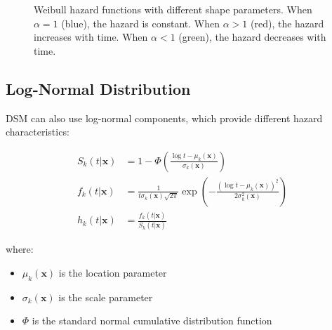 \begin{figure}[htbp]
    \centering
    \caption{Weibull hazard functions with different shape parameters. When $\alpha = 1$ (blue), the hazard is constant. When $\alpha > 1$ (red), the hazard increases with time. When $\alpha < 1$ (green), the hazard decreases with time.}
    \label{fig:weibull-hazards}
\end{figure}

\subsection{Log-Normal Distribution}

DSM can also use log-normal components, which provide different hazard characteristics:

\begin{equationbox}[title=Log-Normal Distribution Functions]
\begin{align}
    S_k(t|\mathbf{x}) &= 1 - \Phi\left(\frac{\log t - \mu_k(\mathbf{x})}{\sigma_k(\mathbf{x})}\right) \\
    f_k(t|\mathbf{x}) &= \frac{1}{t\sigma_k(\mathbf{x})\sqrt{2\pi}}\exp\left(-\frac{(\log t - \mu_k(\mathbf{x}))^2}{2\sigma_k^2(\mathbf{x})}\right) \\
    h_k(t|\mathbf{x}) &= \frac{f_k(t|\mathbf{x})}{S_k(t|\mathbf{x})}
\end{align}

where:
\begin{itemize}
    \item $\mu_k(\mathbf{x})$ is the location parameter
    \item $\sigma_k(\mathbf{x})$ is the scale parameter
    \item $\Phi$ is the standard normal cumulative distribution function
\end{itemize}
\end{equationbox}

